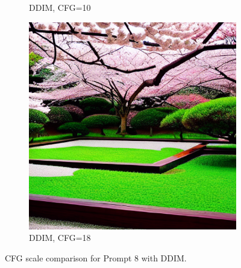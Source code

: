 \documentclass[10pt,twocolumn]{article}
\begin{document}
\begin{figure}[H]
\begin{subfigure}{0.32\textwidth}
        \caption{DDIM, CFG=10}
    \end{subfigure}
    \begin{subfigure}{0.32\textwidth}
        \includegraphics[width=\linewidth]{figures/baseline_ddim_cfg18.0_512_prompt8_20250712_111442.png}
        \caption{DDIM, CFG=18}
    \end{subfigure}
    \caption{CFG scale comparison for Prompt 8 with DDIM.}
\end{figure}

\twocolumn
\end{document}
